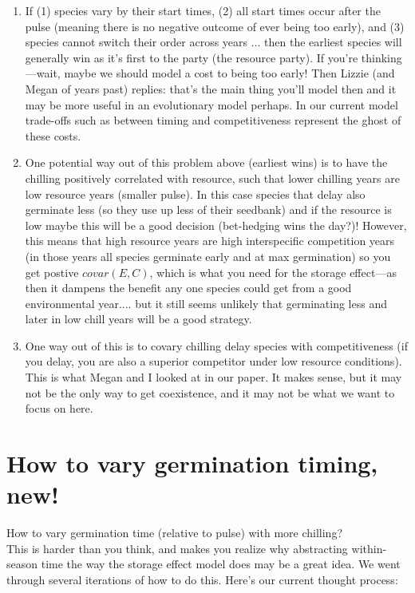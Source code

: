 \documentclass[11pt,letter]{article}
\begin{document}
\begin{enumerate}
\item If (1) species vary by their start times, (2) all start times occur after the pulse (meaning there is no negative outcome of ever being too early), and (3) species cannot switch their order across years ... then the earliest species will generally win as it's first to the party (the resource party). If you're thinking---wait, maybe we should model a cost to being too early! Then Lizzie (and Megan of years past) replies: that's the main thing you'll model then and it may be more useful in an evolutionary model perhaps. In our current model trade-offs such as between timing and competitiveness represent the ghost of these costs. 
\item One potential way out of this problem above (earliest wins) is to have the chilling positively correlated with resource, such that lower chilling years are low resource years (smaller pulse). In this case species that delay also germinate less (so they use up less of their seedbank) and if the resource is low maybe this will be a good decision (bet-hedging wins the day?)! However, this means that high resource years are high interspecific competition years (in those years all species germinate early and at max germination) so you get postive $covar(E,C)$, which is what you need for the storage effect---as then it dampens the benefit any one species could get from a good environmental year.... but it still seems unlikely that germinating less and later in low chill years will be a good strategy.
\item One way out of this is to covary chilling delay species with competitiveness (if you delay, you are also a superior competitor under low resource conditions). This is what Megan and I looked at in our paper. It makes sense, but it may not be the only way to get coexistence, and it may not be what we want to focus on here. 
\end{enumerate}


\section{How to vary germination timing, new!} 

How to vary germination time (relative to pulse) with more chilling? \\

This is harder than you think, and makes you realize why abstracting within-season time the way the storage effect model does may be a great idea. We went through several iterations of how to do this. Here's our current thought process:\\
\end{document}
